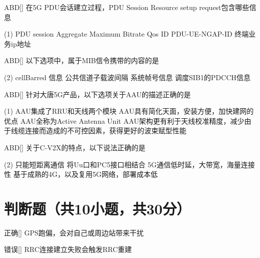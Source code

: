 \begin{choice}{\;ABD\;}[]
    在5G PDU会话建立过程，PDU Session Resource setup request包含哪些信息
    \begin{tasks}(1)
        \task PDU session Aggregate Maximum Bitrate
        \task Qos ID
        \task PDU-UE-NGAP-ID
        \task 终端业务ip地址
    \end{tasks}
\end{choice}

\begin{choice}{\;ABD\;}[]
    以下选项中，属于MIB信令携带的内容的是
    \begin{tasks}(2)
        \task cellBarred 信息
        \task 公共信道子载波间隔
        \task 系统帧号信息
        \task 调度SIB1的PDCCH信息
    \end{tasks}
\end{choice}

\begin{choice}{\;ABD\;}[]
    针对大唐5G产品，以下选项关于AAU的描述正确的是
    \begin{tasks}(1)
        \task AAU集成了RRU和天线两个模块
        \task AAU具有简化天面，安装方便，加快建网的优点
        \task AAU全称为Active Antenna Unit
        \task AAU架构更有利于天线校准精度，减少由于线缆连接而造成的不可控因素，获得更好的波束赋型性能
    \end{tasks}
\end{choice}

\begin{choice}{\;ABD\;}[]
    关于C-V2X的特点，以下说法正确的是
    \begin{tasks}(2)
        \task 只能短距离通信
        \task 将Uu口和PC5接口相结合
        \task 5G通信低时延，大带宽，海量连接性
        \task 基于成熟的4G，以及复用5G网络，部署成本低
    \end{tasks}
\end{choice}




\section{判断题（共10小题，共30分）}

\begin{choice}{\;正确\;}[]
    GPS跑偏，会对自己或周边站带来干扰
\end{choice}


\begin{choice}{\;错误\;}[]
    RRC连接建立失败会触发RRC重建
\end{choice}

